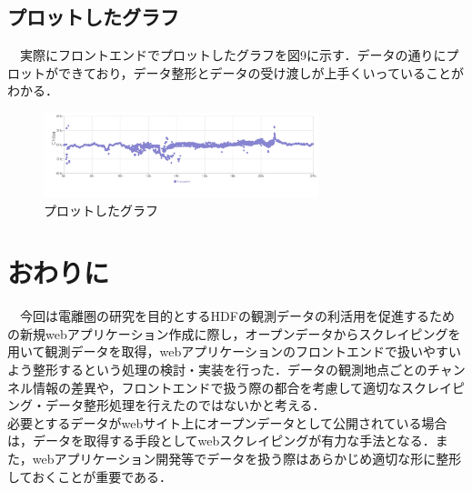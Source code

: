 
 
\subsection{プロットしたグラフ}
　実際にフロントエンドでプロットしたグラフを図9に示す．データの通りにプロットができており，データ整形とデータの受け渡しが上手くいっていることがわかる．\\
 \begin{figure}[h]
   \centering
   \includegraphics[width=80mm]{fig/graph.png}
      \caption{プロットしたグラフ}
 \end{figure}


\section{おわりに}
　今回は電離圏の研究を目的とするHDFの観測データの利活用を促進するための新規webアプリケーション作成に際し，オープンデータからスクレイピングを用いて観測データを取得，webアプリケーションのフロントエンドで扱いやすいよう整形するという処理の検討・実装を行った．データの観測地点ごとのチャンネル情報の差異や，フロントエンドで扱う際の都合を考慮して適切なスクレイピング・データ整形処理を行えたのではないかと考える．\\
 必要とするデータがwebサイト上にオープンデータとして公開されている場合は，データを取得する手段としてwebスクレイピングが有力な手法となる．また，webアプリケーション開発等でデータを扱う際はあらかじめ適切な形に整形しておくことが重要である．\\
　

